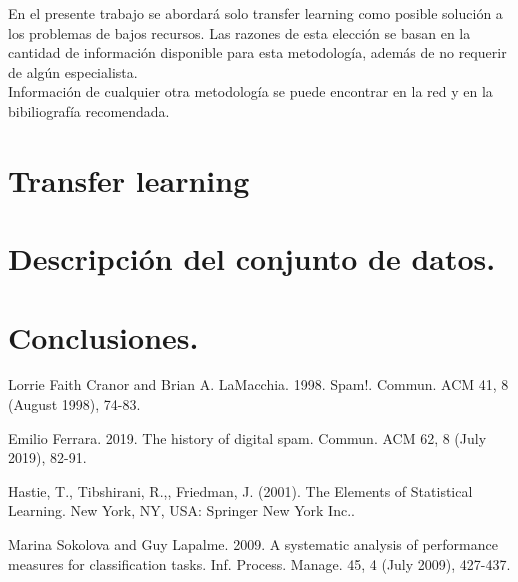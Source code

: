 \documentclass[12pt, letterpaper]{article}
\begin{document}
En el presente trabajo se abordará solo transfer learning como posible solución a los problemas de bajos recursos. Las razones de esta elección se basan en la cantidad de información disponible para esta metodología, además de no requerir de algún especialista.\\

Información de cualquier otra metodología se puede encontrar en la red y en la bibiliografía recomendada.

\section{Transfer learning}


\section{Descripción del conjunto de datos.}


\section{Conclusiones.}


\begin{thebibliography}{1}

Lorrie Faith Cranor and Brian A. LaMacchia. 1998. Spam!. Commun. ACM 41, 8 (August 1998), 74-83. 

Emilio Ferrara. 2019. The history of digital spam. Commun. ACM 62, 8 (July 2019), 82-91. 

Hastie, T., Tibshirani, R.,, Friedman, J. (2001). The Elements of Statistical Learning. New York, NY, USA: Springer New York Inc.. 

Marina Sokolova and Guy Lapalme. 2009. A systematic analysis of performance measures for classification tasks. Inf. Process. Manage. 45, 4 (July 2009), 427-437. 

\end{thebibliography}
\end{document}
